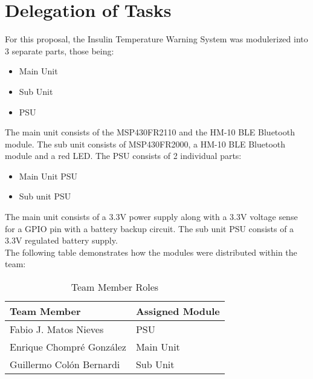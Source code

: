 \section{Delegation of Tasks}
For this proposal, the Insulin Temperature Warning System was modulerized into 3 separate parts, those being:
\begin{itemize}
  \item Main Unit
  \item Sub Unit
  \item PSU
\end{itemize}
The main unit consists of the MSP430FR2110 and the HM-10 BLE Bluetooth module. The sub unit consists of MSP430FR2000, a HM-10 BLE Bluetooth module and a red LED. The PSU consists of 2 individual parts:
\begin{itemize}
  \item Main Unit PSU
  \item Sub unit PSU
\end{itemize}
The main unit consists of a 3.3\si{\V} power supply along with a 3.3\si{\V} voltage sense for a GPIO pin with a battery backup circuit.  The sub unit PSU consists of a 3.3\si{\V} regulated battery supply.\\
The following table demonstrates how the modules were distributed within the team:
\begin{table}[h]
\begin{center}
\begin{tabularx}{\textwidth}{|X|X|}
 \hline
 Team Member & Assigned Module\\
 \hline
 Fabio J. Matos Nieves & PSU\\
 \hline
 Enrique Chompré González& Main Unit\\
 \hline
 Guillermo Colón Bernardi& Sub Unit\\
 \hline
\end{tabularx}
\end{center}
\caption{Team Member Roles}
\label{Task-Delegation}
\end{table}
